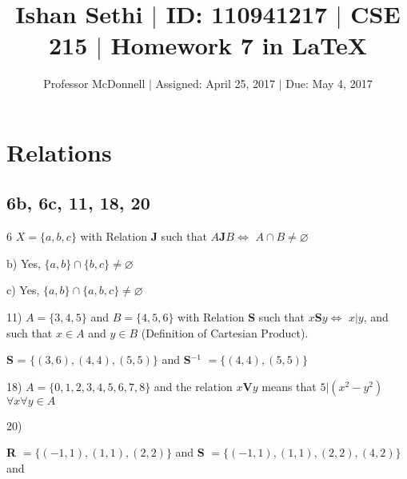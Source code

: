 \documentclass[11pt]{article}
\newcommand*{\mybox}[1]{\framebox{#1}}
\begin{document}
\title{\vspace{-.5in} Ishan Sethi $|$ ID: 110941217 $|$ CSE 215 $|$ Homework 7 in \LaTeX}
\author{Professor McDonnell $|$ Assigned: April 25, 2017 $|$ Due: May 4, 2017}
\date{}
\maketitle
\hrulefill
\tableofcontents

\section{Relations}
\subsection{6b, 6c, 11, 18, 20}
\begin{flushleft}


6 $X=\{a,b,c\}$ with Relation \textbf{J} such that $A$\textbf{J}$B\Leftrightarrow$ $A\cap B \neq \varnothing$

b) Yes,  $\{a,b \}\cap \{ b,c\} \neq \varnothing$


c) Yes,  $\{a,b \}\cap \{ a,b,c\} \neq \varnothing$


\hrulefill


11) $A=\{3,4,5\}$ and $B=\{4,5,6 \}$ with Relation \textbf{S} such that $x$\textbf{S}$y\Leftrightarrow$ $x| y $, and such that $x\in A$ and $y\in B$ (Definition of Cartesian Product). 

\textbf{S} = $\{ (3,6), (4,4), (5,5) \}$ and \textbf{S$^{-1}$} $= \{ (4,4), (5,5) \}$

\hrulefill

18) $A=\{0,1,2,3,4,5,6,7,8 \}$ and the relation $x$\textbf{V}$y$ means that $5| (x^2 - y^2)$ $\forall x\forall y \in A$

\vspace{40mm}


\hrulefill

20) 

\textbf{R} $= \{ (-1,1),(1,1),(2,2)\}$ and
\textbf{S} $= \{ (-1,1),(1,1),(2,2), (4,2)\}$ and
\mybox{\textbf{R} $\cap$ \textbf{S} = $= \{ (-1,1),(1,1),(2,2)\}$}

\hrulefill
\end{flushleft}
\end{document}
